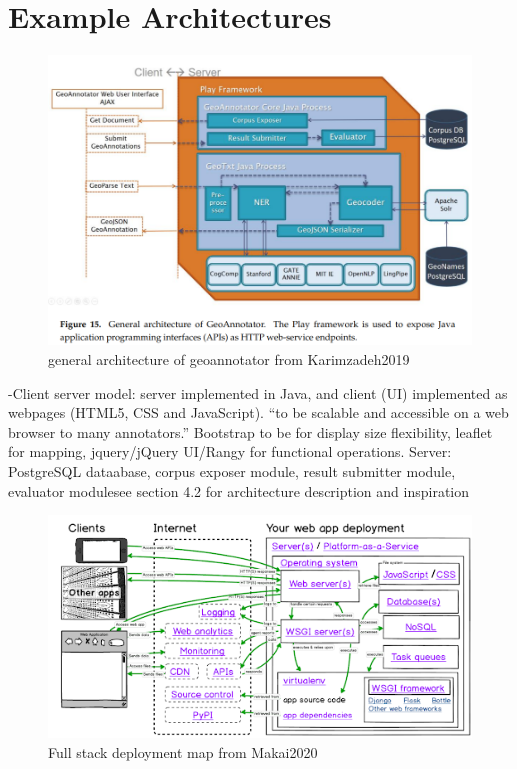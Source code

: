 \section{Example Architectures}
\begin{figure}[H]
	\centering
	\includegraphics[width=.9\linewidth]{images/karimzadeh2019_figure15.png}
	\caption{general architecture of geoannotator from Karimzadeh2019}%
	\label{fig:karimzadeh2019_f15}
\end{figure}
-{\color{orange}Client server model: server implemented in Java, and client (UI) implemented as webpages (HTML5, CSS and JavaScript). “to be scalable and accessible on a web browser to many annotators.” Bootstrap to be for display size flexibility, leaflet for mapping, jquery/jQuery UI/Rangy for functional operations. Server: PostgreSQL dataabase, corpus exposer module, result submitter module, evaluator module\cite{Karimzadeh2019}}{\color{red}see section 4.2 for architecture description and inspiration}\\

\begin{figure}[H]
	\centering
	\includegraphics[width=.9\linewidth]{images/makai2020_fullstackdeploymentmap.png}
	\caption{Full stack deployment map from Makai2020}%
	\label{fig:Makai2020_f}
\end{figure}

